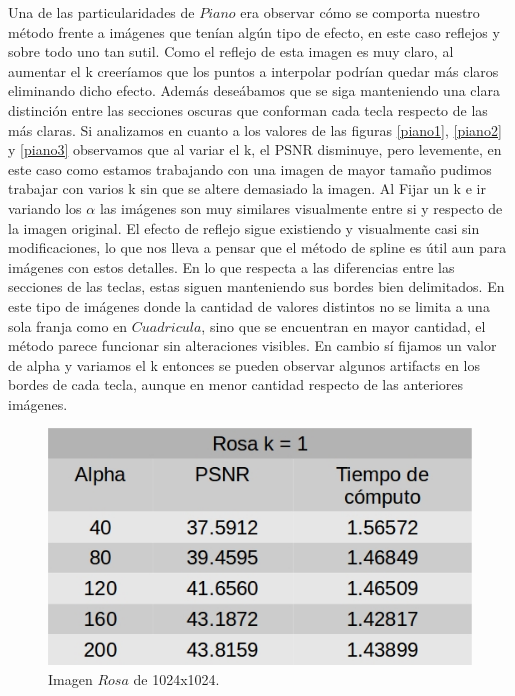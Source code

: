 \documentclass[a4paper]{article}
\begin{document}
Una de las particularidades de $Piano$ era observar cómo se comporta nuestro método frente a imágenes que tenían algún tipo de efecto, en este caso reflejos y sobre todo uno tan sutil. Como el reflejo de esta imagen es muy claro, al aumentar el k creeríamos que los puntos a interpolar podrían quedar más claros eliminando dicho efecto. Además deseábamos que se siga manteniendo una clara distinción entre las secciones oscuras que conforman cada tecla respecto de las más claras.
 Si analizamos en cuanto a los valores de las figuras \ref{piano1}, \ref{piano2} y \ref{piano3} observamos que al variar el k, el PSNR disminuye, pero levemente, en este caso como estamos trabajando con una imagen de mayor tamaño pudimos trabajar con varios k sin que se altere demasiado la imagen. Al Fijar un k e ir variando los $\alpha$ las imágenes son muy similares visualmente entre si y respecto de la imagen original. El efecto de reflejo sigue existiendo y visualmente casi sin modificaciones, lo que nos lleva a pensar que el método de spline es útil aun para imágenes con estos detalles. En lo que respecta a las diferencias entre las secciones de las teclas, estas siguen manteniendo sus bordes bien delimitados. 
En este tipo de imágenes donde la cantidad de valores distintos no se limita a una sola franja como en $Cuadricula$, sino que se encuentran en mayor cantidad, el método parece funcionar sin alteraciones visibles. En cambio sí fijamos un valor de alpha y variamos el k entonces se pueden observar algunos artifacts en los bordes de cada tecla, aunque en menor cantidad respecto de las anteriores imágenes.  
    
    \begin{figure}[H]
    \centering
    \includegraphics[scale=0.4]{imagenes/rosa1.jpg}
    \caption{Imagen $Rosa$ de 1024x1024.}
	\label{rosa1}
    \end{figure}
    
\end{document}
